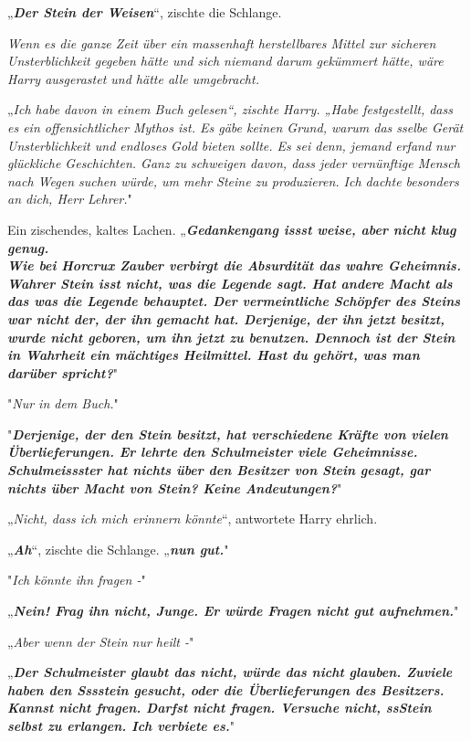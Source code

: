 {\hfill\break „\textbf{\emph{Der Stein der Weisen}}“, zischte die Schlange.

\emph{Wenn es die ganze Zeit über ein massenhaft herstellbares Mittel zur sicheren Unsterblichkeit gegeben hätte und sich niemand darum gekümmert hätte, wäre Harry ausgerastet und hätte alle umgebracht.}

„\emph{Ich habe davon in einem Buch gelesen“, zischte Harry. „Habe festgestellt, dass es ein offensichtlicher Mythos ist. Es gäbe keinen Grund, warum das sselbe Gerät Unsterblichkeit und endloses Gold bieten sollte. Es sei denn, jemand erfand nur glückliche Geschichten. Ganz zu schweigen davon, dass jeder vernünftige Mensch nach Wegen suchen würde, um mehr Steine zu produzieren. Ich dachte besonders an dich, Herr Lehrer.}"

Ein zischendes, kaltes Lachen. „\textbf{\emph{Gedankengang issst weise, aber nicht klug genug.\\ Wie bei Horcrux Zauber verbirgt die Absurdität das wahre Geheimnis. Wahrer Stein isst nicht, was die Legende sagt. Hat andere Macht als das was die Legende behauptet. Der vermeintliche Schöpfer des Steins war nicht der, der ihn gemacht hat. Derjenige, der ihn jetzt besitzt, wurde nicht geboren, um ihn jetzt zu benutzen. Dennoch ist der Stein in Wahrheit ein mächtiges Heilmittel. Hast du gehört, was man darüber spricht?}}"

"\emph{Nur in dem Buch.}"

"\textbf{\emph{Derjenige, der den Stein besitzt, hat verschiedene Kräfte von vielen Überlieferungen. Er lehrte den Schulmeister viele Geheimnisse. Schulmeissster hat nichts über den Besitzer von Stein gesagt, gar nichts über Macht von Stein? Keine Andeutungen?}}"

„\emph{Nicht, dass ich mich erinnern könnte}“, antwortete Harry ehrlich.

„\textbf{\emph{Ah}}“, zischte die Schlange. „\textbf{\emph{nun gut.}}"

"\emph{Ich könnte ihn fragen -}"

„\textbf{\emph{Nein! Frag ihn nicht, Junge. Er würde Fragen nicht gut aufnehmen.}}"

„\emph{Aber wenn der Stein nur heilt -}"

„\textbf{\emph{Der Schulmeister glaubt das nicht, würde das nicht glauben. Zuviele haben den Sssstein gesucht, oder die Überlieferungen des Besitzers. Kannst nicht fragen. Darfst nicht fragen. Versuche nicht, ssStein selbst zu erlangen. Ich verbiete es.}}"

}
